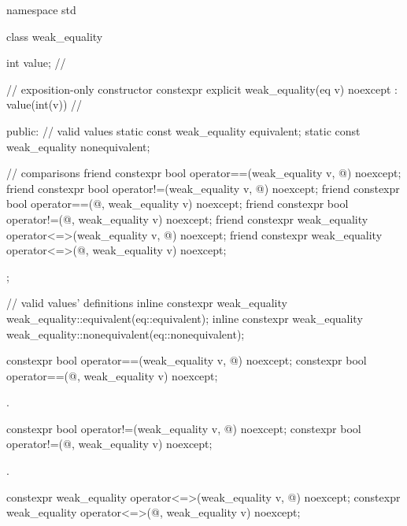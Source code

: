%
%
%
\begin{codeblock}
namespace std {
  class weak_equality {
    int value;  // \expos

    // exposition-only constructor
    constexpr explicit weak_equality(eq v) noexcept : value(int(v)) {}  // \expos

  public:
    // valid values
    static const weak_equality equivalent;
    static const weak_equality nonequivalent;

    // comparisons
    friend constexpr bool operator==(weak_equality v, @\unspec@) noexcept;
    friend constexpr bool operator!=(weak_equality v, @\unspec@) noexcept;
    friend constexpr bool operator==(@\unspec@, weak_equality v) noexcept;
    friend constexpr bool operator!=(@\unspec@, weak_equality v) noexcept;
    friend constexpr weak_equality operator<=>(weak_equality v, @\unspec@) noexcept;
    friend constexpr weak_equality operator<=>(@\unspec@, weak_equality v) noexcept;
  };

  // valid values' definitions
  inline constexpr weak_equality weak_equality::equivalent(eq::equivalent);
  inline constexpr weak_equality weak_equality::nonequivalent(eq::nonequivalent);
}
\end{codeblock}

%
\begin{itemdecl}
constexpr bool operator==(weak_equality v, @\unspec@) noexcept;
constexpr bool operator==(@\unspec@, weak_equality v) noexcept;
\end{itemdecl}

\begin{itemdescr}
\pnum
\returns
{}.
\end{itemdescr}

%
\begin{itemdecl}
constexpr bool operator!=(weak_equality v, @\unspec@) noexcept;
constexpr bool operator!=(@\unspec@, weak_equality v) noexcept;
\end{itemdecl}

\begin{itemdescr}
\pnum
\returns
{}.
\end{itemdescr}

%
\begin{itemdecl}
constexpr weak_equality operator<=>(weak_equality v, @\unspec@) noexcept;
constexpr weak_equality operator<=>(@\unspec@, weak_equality v) noexcept;
\end{itemdecl}

